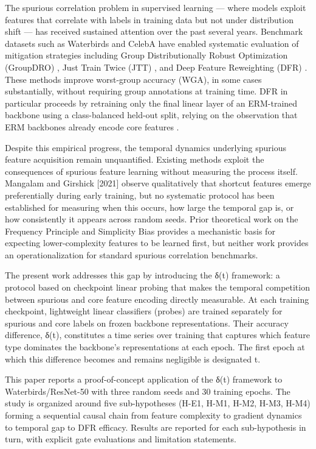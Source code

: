 
The spurious correlation problem in supervised learning — where models exploit features that correlate with labels in training data but not under distribution shift — has received sustained attention over the past several years. Benchmark datasets such as Waterbirds \citep{Sagawaetal2020} and CelebA \citep{Liuetal2021} have enabled systematic evaluation of mitigation strategies including Group Distributionally Robust Optimization (GroupDRO) \citep{Sagawaetal2020}, Just Train Twice (JTT) \citep{Liuetal2021}, and Deep Feature Reweighting (DFR) \citep{Kirichenkoetal2022}. These methods improve worst-group accuracy (WGA), in some cases substantially, without requiring group annotations at training time. DFR in particular proceeds by retraining only the final linear layer of an ERM-trained backbone using a class-balanced held-out split, relying on the observation that ERM backbones already encode core features \citep{Kirichenkoetal2022}.

Despite this empirical progress, the temporal dynamics underlying spurious feature acquisition remain unquantified. Existing methods exploit the consequences of spurious feature learning without measuring the process itself. Mangalam and Girshick [2021] observe qualitatively that shortcut features emerge preferentially during early training, but no systematic protocol has been established for measuring when this occurs, how large the temporal gap is, or how consistently it appears across random seeds. Prior theoretical work on the Frequency Principle \citep{Xuetal2019} and Simplicity Bias \citep{Shahetal2020} provides a mechanistic basis for expecting lower-complexity features to be learned first, but neither work provides an operationalization for standard spurious correlation benchmarks.

The present work addresses this gap by introducing the δ(t) framework: a protocol based on checkpoint linear probing that makes the temporal competition between spurious and core feature encoding directly measurable. At each training checkpoint, lightweight linear classifiers (probes) are trained separately for spurious and core labels on frozen backbone representations. Their accuracy difference, δ(t), constitutes a time series over training that captures which feature type dominates the backbone's representations at each epoch. The first epoch at which this difference becomes and remains negligible is designated t\*.

This paper reports a proof-of-concept application of the δ(t) framework to Waterbirds/ResNet-50 with three random seeds and 30 training epochs. The study is organized around five sub-hypotheses (H-E1, H-M1, H-M2, H-M3, H-M4) forming a sequential causal chain from feature complexity to gradient dynamics to temporal gap to DFR efficacy. Results are reported for each sub-hypothesis in turn, with explicit gate evaluations and limitation statements.


